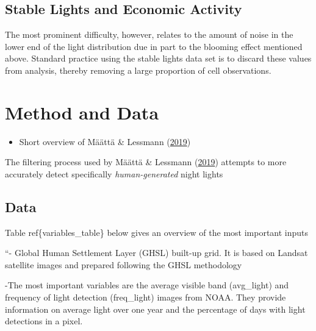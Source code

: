 \documentclass[11pt,preprint, authoryear]{elsarticle}
\numberwithin{equation}{section}
\numberwithin{figure}{section}
\numberwithin{table}{section}
\def\tightlist{} %
\begin{document}
\hypertarget{stable-lights-and-economic-activity}{%
\subsection{Stable Lights and Economic
Activity}\label{stable-lights-and-economic-activity}}

The most prominent difficulty, however, relates to the amount of noise
in the lower end of the light distribution due in part to the blooming
effect mentioned above. Standard practice using the stable lights data
set is to discard these values from analysis, thereby removing a large
proportion of cell observations.

\hypertarget{method-and-data}{%
\section{\texorpdfstring{Method and Data
\label{Methodology}}{Method and Data }}\label{method-and-data}}

\begin{itemize}
\tightlist
\item
  Short overview of Määttä \& Lessmann
  (\protect\hyperlink{ref-maatta}{2019})
\end{itemize}

The filtering process used by Määttä \& Lessmann
(\protect\hyperlink{ref-maatta}{2019}) attempts to more accurately
detect specifically \emph{human-generated} night lights

\hypertarget{data}{%
\subsection{Data}\label{data}}

Table ref\{variables\_table\} below gives an overview of the most
important inputs

``- Global Human Settlement Layer (GHSL) built-up grid. It is based on
Landsat satellite images and prepared following the GHSL methodology

-The most important variables are the average visible band (avg\_light)
and frequency of light detection (freq\_light) images from NOAA. They
provide information on average light over one year and the percentage of
days with light detections in a pixel.
\end{document}
